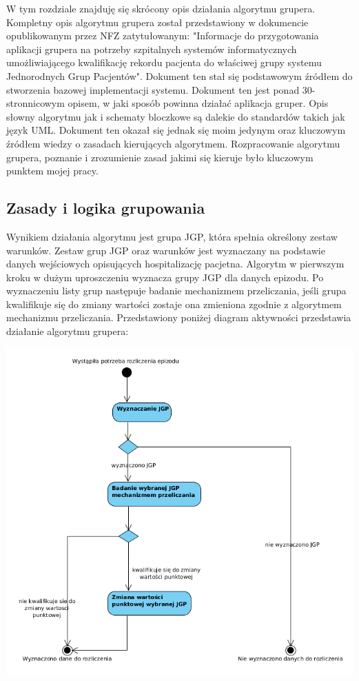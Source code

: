 W tym rozdziale znajduję się skrócony opis działania algorytmu grupera. Kompletny opis algorytmu grupera został przedstawiony w dokumencie opublikowanym przez NFZ zatytułowanym: "Informacje do przygotowania aplikacji grupera na potrzeby szpitalnych systemów informatycznych umożliwiającego kwalifikację rekordu pacjenta do właściwej grupy systemu Jednorodnych Grup Pacjentów". Dokument ten stał się podstawowym źródłem do stworzenia bazowej implementacji systemu. Dokument ten jest ponad 30-stronnicowym opisem, w jaki sposób powinna działać aplikacja gruper. Opis słowny algorytmu jak i schematy bloczkowe są dalekie do standardów takich jak język UML. Dokument ten okazał się jednak się moim jedynym oraz kluczowym źródłem wiedzy o zasadach kierujących algorytmem. Rozpracowanie algorytmu grupera, poznanie i zrozumienie zasad jakimi się kieruje było kluczowym punktem mojej pracy.

\subsection{Zasady i logika grupowania}
\label{sec:zasadyLogikaGrupowania}
Wynikiem działania algorytmu jest grupa JGP, która spełnia określony zestaw warunków. Zestaw grup JGP oraz warunków jest wyznaczany na podstawie danych wejściowych opisujących hospitalizację pacjetna. Algorytm w pierwszym kroku w dużym uproszczeniu wyznacza grupy JGP dla danych epizodu. Po wyznaczeniu listy grup następuje badanie mechanizmem przeliczania, jeśli grupa kwalifikuje się do zmiany wartości zostaje ona zmieniona zgodnie z algorytmem mechanizmu przeliczania. Przedstawiony poniżej diagram aktywności przedstawia działanie algorytmu grupera:

\includegraphics[scale=0.4]{images/activity-gruper}

